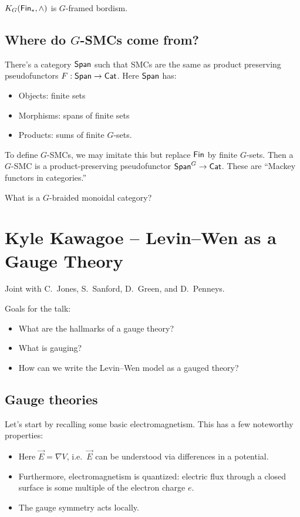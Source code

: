 \documentclass{amsart}
\begin{document}
\begin{ex}
  $K_G(\mathsf{Fin}_*, \wedge)$ is $G$-framed bordism.
\end{ex}

\subsection{Where do $G$-SMCs come from?}

There's a category $\operatorname{\mathsf{Span}}$ such that SMCs are the same as product preserving pseudofunctors $F: \operatorname{\mathsf{Span}} \to \mathsf{Cat}$.
Here $\operatorname{\mathsf{Span}}$ has:
\begin{itemize}
  \item Objects: finite sets
  \item Morphisms: spans of finite sets
  \item Products: sums of finite $G$-sets.
\end{itemize}

To define $G$-SMCs, we may imitate this but replace $\mathsf{Fin}$ by finite $G$-sets.
Then a $G$-SMC is a product-preserving pseudofunctor $\operatorname{\mathsf{Span}}^G \to \mathsf{Cat}$.
These are ``Mackey functors in categories.''

\begin{qn}
  What is a $G$-braided monoidal category?
\end{qn}

\section{Kyle Kawagoe -- Levin--Wen as a Gauge Theory}

Joint with C.\ Jones, S.\ Sanford, D.\ Green, and D.\ Penneys.

Goals for the talk:
\begin{itemize}
  \item What are the hallmarks of a gauge theory?
  \item What is gauging?
  \item How can we write the Levin--Wen model as a gauged theory?
\end{itemize}

\subsection{Gauge theories}

\begin{ex}
  Let's start by recalling some basic electromagnetism.
  This has a few noteworthy properties:
  \begin{itemize}
  \item Here $\vec{E} = \nabla V$, i.e.\ $\vec{E}$ can be understood via differences in a potential.
  \item Furthermore, electromagnetism is quantized: electric flux through a closed surface is some multiple of the electron charge $e$.
  \item The gauge symmetry acts locally.
  \end{itemize}
\end{ex}
\end{document}
